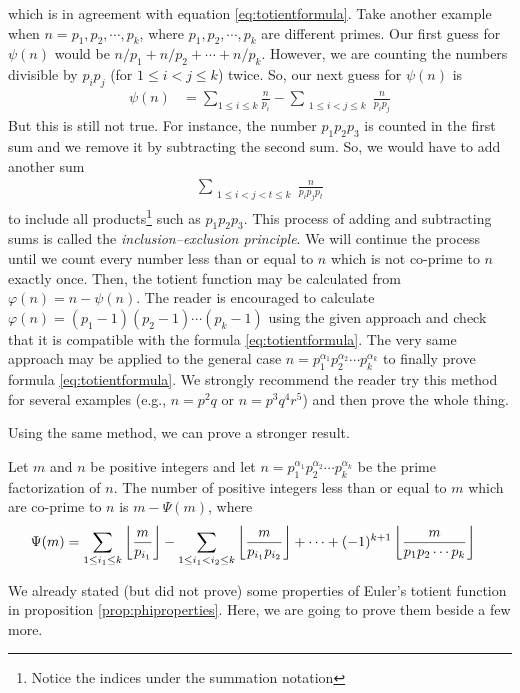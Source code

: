 	which is in agreement with equation \ref{eq:totientformula}. Take another example when $n=p_1,p_2,\cdots,p_k$, where $p_1,p_2,\cdots,p_k$ are different primes. Our first guess for $\psi(n)$ would be $n/p_1 +‌n/p_2 + \cdots + n/p_k$. However, we are counting the numbers divisible by $p_ip_j$ (for $1\leq i <j \leq k$) twice. So, our next guess for $\psi(n)$ is
		\begin{align*}
			\psi(n) &= \sum_{1 \leq i \leq k} \frac{n}{p_i} - \sum_{\substack{1 \leq i < j\leq k }} \frac{n}{p_ip_j}
		\end{align*}
	But this is still not true. For instance, the number $p_1p_2p_3$ is counted in the first sum and we remove it by subtracting the second sum. So, we would have to add another sum
		\begin{align*}
			\sum\limits_{\substack{1\leq i<j<t\leq k}} \frac{n}{p_ip_jp_t}
		\end{align*}
	to include all products\footnote{Notice the indices under the summation notation} such as $p_1p_2p_3$. This process of adding and subtracting sums is called the \textit{inclusion--exclusion principle}. We will continue the process until we count every number less than or equal to $n$ which is not co-prime to $n$ exactly once. Then, the totient function may be calculated from $\varphi(n) = n - \psi(n)$. The reader is encouraged to calculate $\varphi(n) = (p_1-1)(p_2-1) \cdots (p_k-1)$ using the given approach and check that it is compatible with the formula \ref{eq:totientformula}. The very same approach may be applied to the general case $n= p_1^{\alpha_1} p_2^{\alpha_2} \cdots p_k^{\alpha_k}$ to finally prove formula \ref{eq:totientformula}. We strongly recommend the reader try this method for several examples (e.g., $n=p^2q$ or $n = p^3 q^4r^5$) and then prove the whole thing.

	Using the same method, we can prove a stronger result.

	\begin{theorem}
		Let $m$ and $n$ be positive integers and let $n= p_1^{\alpha_1} p_2^{\alpha_2} \cdots p_k^{\alpha_k}$ be the prime factorization of $n$. The number of positive integers less than or equal to $m$ which are co-prime to $n$ is $m - \Psi(m)$, where
		\begin{align*}
		\Psi(m) &= \sum_{1 \leq i_1 \leq k} \left\lfloor{\frac{m}{p_{i_1}}}\right\rfloor- \sum_{\substack{1 \leq i_1<i_2 \leq k}} \left\lfloor{\frac{m}{p_{i_1}p_{i_2}}}\right\rfloor+ \cdots + (-1)^{k+1}\left\lfloor{\frac{m}{p_1p_2\cdots p_k}}\right\rfloor
		\end{align*}
	\end{theorem}
	We already stated (but did not prove) some properties of Euler's totient function in proposition \ref{prop:phiproperties}. Here, we are going to prove them beside a few more.

